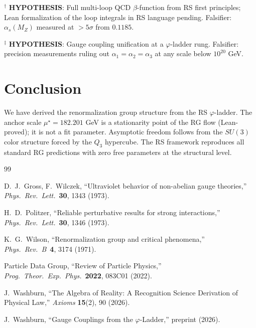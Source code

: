 \documentclass[12pt,a4paper]{article}
\theoremstyle{definition}
\theoremstyle{remark}
\begin{document}
$^\dagger$ \textbf{HYPOTHESIS}: Full multi-loop QCD $\beta$-function
from RS first principles; Lean formalization of the loop integrals in RS
language pending.  Falsifier: $\alpha_s(M_Z)$ measured at $> 5\sigma$
from $0.1185$.

$^\ddagger$ \textbf{HYPOTHESIS}: Gauge coupling unification at a
$\varphi$-ladder rung.  Falsifier: precision measurements ruling out
$\alpha_1 = \alpha_2 = \alpha_3$ at any scale below $10^{20}$ GeV.

\section{Conclusion}
\label{sec:conclusion}

We have derived the renormalization group structure from the RS
$\varphi$-ladder.  The anchor scale $\mu^\star = 182.201$ GeV is a
stationarity point of the RG flow (Lean-proved); it is not a fit
parameter.  Asymptotic freedom follows from the $SU(3)$ color structure
forced by the $Q_3$ hypercube.  The RS framework reproduces all
standard RG predictions with zero free parameters at the structural level.

\begin{thebibliography}{99}

D.~J.~Gross, F.~Wilczek, ``Ultraviolet behavior of non-abelian gauge
theories,'' \textit{Phys.\ Rev.\ Lett.}\ \textbf{30}, 1343 (1973).

H.~D.~Politzer, ``Reliable perturbative results for strong interactions,''
\textit{Phys.\ Rev.\ Lett.}\ \textbf{30}, 1346 (1973).

K.~G.~Wilson, ``Renormalization group and critical phenomena,''
\textit{Phys.\ Rev.\ B}\ \textbf{4}, 3174 (1971).

Particle Data Group, ``Review of Particle Physics,''
\textit{Prog.\ Theor.\ Exp.\ Phys.}\ \textbf{2022}, 083C01 (2022).

J.~Washburn, ``The Algebra of Reality: A Recognition Science Derivation
of Physical Law,'' \textit{Axioms} \textbf{15}(2), 90 (2026).

J.~Washburn, ``Gauge Couplings from the $\varphi$-Ladder,'' preprint (2026).

\end{thebibliography}
\end{document}
